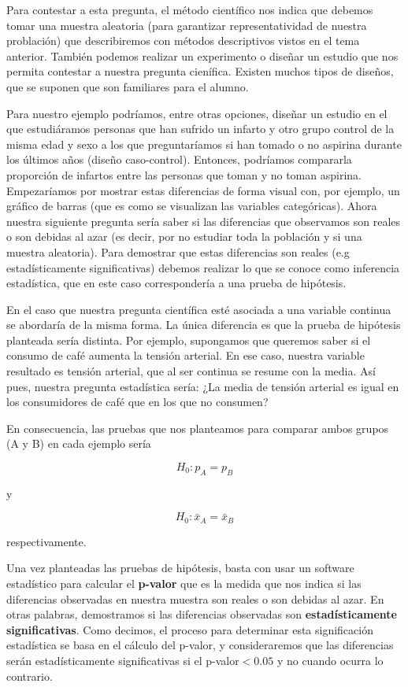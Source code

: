 \documentclass[
]{book}
\begin{document}
Para contestar a esta pregunta, el método científico nos indica que debemos tomar una muestra aleatoria (para garantizar representatividad de nuestra problación) que describiremos con métodos descriptivos vistos en el tema anterior. También podemos realizar un experimento o diseñar un estudio que nos permita contestar a nuestra pregunta cienífica. Existen muchos tipos de diseños, que se suponen que son familiares para el alumno.

Para nuestro ejemplo podríamos, entre otras opciones, diseñar un estudio en el que estudiáramos personas que han sufrido un infarto y otro grupo control de la misma edad y sexo a los que preguntaríamos si han tomado o no aspirina durante los últimos años (diseño caso-control). Entonces, podríamos compararla proporción de infartos entre las personas que toman y no toman aspirina. Empezaríamos por mostrar estas diferencias de forma visual con, por ejemplo, un gráfico de barras (que es como se visualizan las variables categóricas). Ahora nuestra siguiente pregunta sería saber si las diferencias que observamos son reales o son debidas al azar (es decir, por no estudiar toda la población y si una muestra aleatoria). Para demostrar que estas diferencias son reales (e.g estadísticamente significativas) debemos realizar lo que se conoce como inferencia estadística, que en este caso correspondería a una prueba de hipótesis.

En el caso que nuestra pregunta científica esté asociada a una variable continua se abordaría de la misma forma. La única diferencia es que la prueba de hipótesis planteada sería distinta. Por ejemplo, supongamos que queremos saber si el consumo de café aumenta la tensión arterial. En ese caso, nuestra variable resultado es tensión arterial, que al ser continua se resume con la media. Así pues, nuestra pregunta estadística sería: ¿La media de tensión arterial es igual en los consumidores de café que en los que no consumen?

En consecuencia, las pruebas que nos planteamos para comparar ambos grupos (A y B) en cada ejemplo sería

\[H_0: p_A = p_B\]

y

\[H_0: \bar{x}_A = \bar{x}_B\]

respectivamente.

Una vez planteadas las pruebas de hipótesis, basta con usar un software estadístico para calcular el \textbf{p-valor} que es la medida que nos indica si las diferencias observadas en nuestra muestra son reales o son debidas al azar. En otras palabras, demostramos si las diferencias observadas son \textbf{estadísticamente significativas}. Como decimos, el proceso para determinar esta significación estadística se basa en el cálculo del p-valor, y consideraremos que las diferencias serán estadísticamente significativas si el p-valor\(<0.05\) y no cuando ocurra lo contrario.
\end{document}
